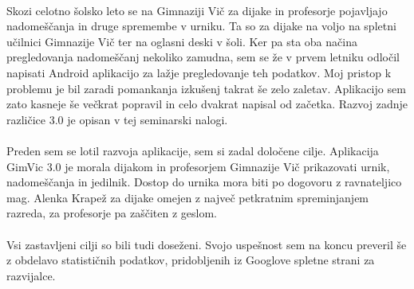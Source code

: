 \paragraph{} Skozi celotno šolsko leto se na Gimnaziji Vič za dijake in profesorje pojavljajo nadomeščanja in druge spremembe v urniku. Ta so za dijake na voljo na spletni učilnici Gimnazije Vič ter na oglasni deski v šoli. Ker pa sta oba načina pregledovanja nadomeščanj nekoliko zamudna, sem se že v prvem letniku odločil napisati Android\cite{android-wiki} aplikacijo za lažje pregledovanje teh podatkov. Moj pristop k problemu je bil zaradi pomankanja izkušenj takrat še zelo zaletav. Aplikacijo sem zato kasneje še večkrat popravil in celo dvakrat napisal od začetka. Razvoj zadnje različice 3.0 je opisan v tej seminarski nalogi.

\paragraph{} Preden sem se lotil razvoja aplikacije, sem si zadal določene cilje. Aplikacija GimVic 3.0 je morala dijakom in profesorjem Gimnazije Vič prikazovati urnik, nadomeščanja in jedilnik. Dostop do urnika mora biti po dogovoru z ravnateljico mag. Alenka Krapež za dijake omejen z največ petkratnim spreminjanjem razreda, za profesorje pa zaščiten z geslom.

\paragraph{} Vsi zastavljeni cilji so bili tudi doseženi. Svojo uspešnost sem na koncu preveril še z obdelavo statističnih podatkov, pridobljenih iz Googlove spletne strani za razvijalce.
